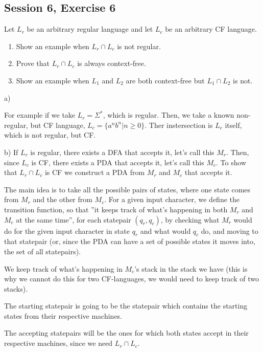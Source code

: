 \subsection {Session 6, Exercise 6}


Let $L_r$ be an arbitrary regular language and let $L_c$ be an arbitrary CF language.
\begin{enumerate}
    \item Show an example when $L_r \cap L_c$ is not regular.
    \item Prove that $L_r \cap L_c$ is always context-free.
    \item Show an example when $L_1$ and $L_2$ are both context-free but $L_1 \cap L_2$ is not.
\end{enumerate}


a)

For example if we take $L_r = \Sigma^*$, which is regular. Then, we take a known non-regular, but CF language, $L_c = \{a^nb^n | n \geq{} 0\}$. Ther instersection is $L_c$ itself, which is not regular, but CF.

b) If $L_r$ is regular, there exists a DFA that accepts it, let's call this $M_r$. Then, since $L_c$ is CF, there exists a PDA that accepts it, let's call this $M_c$. To show that $L_r \cap L_c$ is CF we construct a PDA from $M_r$ and $M_c$ that accepts it.

The main idea is to take all the possible pairs of states, where one state comes from $M_r$ and the other from $M_c$. For a given input character, we define the transition function, so that ''it keeps track of what's happening in both $M_r$ and $M_c$ at the same time'', for each statepair $(q_r, q_c)$, by checking what $M_r$ would do for the given input character in state $q_r$ and what would $q_c$ do, and moving to that statepair (or, since the PDA can have a set of possible states it moves into, the set of all statepairs).

We keep track of what's happening in $M_c$'s stack in the stack we have (this is why we cannot do this for two CF-languages, we would need to keep track of two stacks).

The starting statepair is going to be the statepair which contains the starting states from their respective machines.

The accepting statepairs will be the ones for which both states accept in their respective machines, since we need $L_r \cap L_c$.

